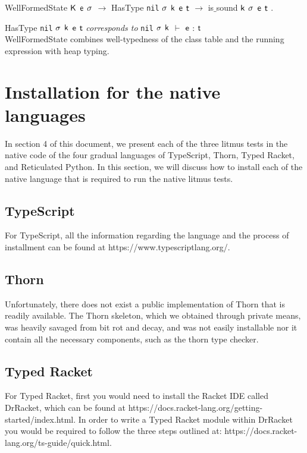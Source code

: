\documentclass[]{article}
\begin{document}
WellFormedState ${\sf{K}}$ $\e$ $\sigma$ $\rightarrow$ HasType \texttt{nil} $\sigma$ ${\sf{k}}$ $\e$ $\t$ $\rightarrow$ is$\_$sound ${\sf{k}}$ $\sigma$ $\e$ $\t$ .

HasType \texttt{nil} $\sigma$ ${\sf{k}}$ $\e$ $\t$ \textit{corresponds to} \texttt{nil} $\sigma$ ${\sf{k}}$ $\vdash$ $\e$ : $\t$ \\

WellFormedState combines well-typedness of the class table and the running expression with heap typing.

\section{Installation for the native languages}

In section 4 of this document, we present each of the three litmus tests in the native code of the four gradual languages of TypeScript, Thorn, Typed Racket, and Reticulated Python. In this section, we will discuss how to install each of the native language that is required to run the native litmus tests.

\subsection{TypeScript}

For TypeScript, all the information regarding the language and the process of installment can be found at https://www.typescriptlang.org/.

\subsection{Thorn}

Unfortunately, there does not exist a public implementation of Thorn that is readily available. The Thorn skeleton, which we obtained through private means, was heavily savaged from bit rot and decay, and was not easily installable nor it contain all the necessary components, such as the thorn type checker.

\subsection{Typed Racket}

For Typed Racket, first you would need to install the Racket IDE called DrRacket, which can be found at https://docs.racket-lang.org/getting-started/index.html. In order to write a Typed Racket module within DrRacket you would be required to follow the three steps outlined at: https://docs.racket-lang.org/ts-guide/quick.html.
\end{document}
